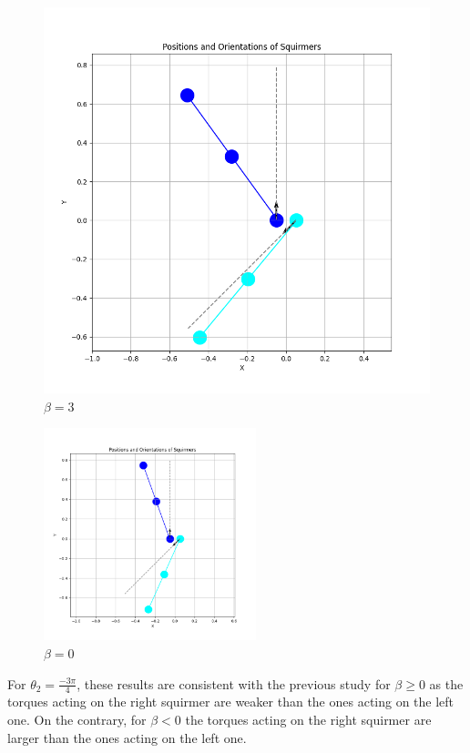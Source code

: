 \documentclass{article}
\begin{document}
\begin{figure}[H]
\begin{minipage}{0.49\textwidth}
        \includegraphics[width=1.1\textwidth]{graphs/simulations/sim_sq_sq/beta3/m3pi_4_.png}
        \caption{\footnotesize $\beta = 3$}
    \end{minipage}
\end{figure}
\begin{figure}[H]
    \centering
    \includegraphics[width=0.55\textwidth]{graphs/simulations/sim_sq_sq/beta0/m3pi_4_.png}
    \caption{\footnotesize $\beta = 0$}
\end{figure}
For $\theta_2 = \frac{-3\pi}{4}$, these results are consistent with the previous study\cite{Stark} for $\beta \ge 0$ as the torques acting on the right squirmer
are weaker than the ones acting on the left one. On the contrary, for $\beta < 0$ the torques acting on the right squirmer are larger
than the ones acting on the left one.
\end{document}
